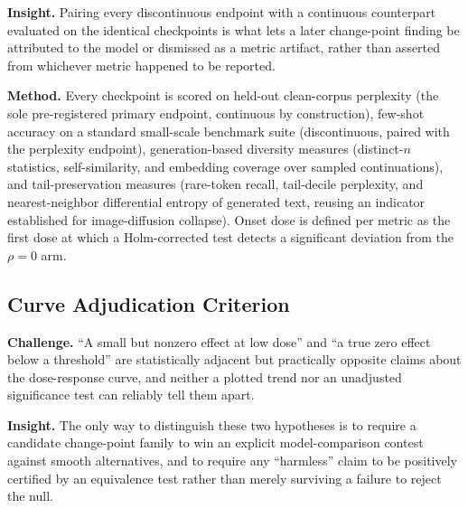 \documentclass[11pt]{article}
\begin{document}
\textbf{Insight.} Pairing every discontinuous endpoint with a continuous counterpart evaluated on the identical checkpoints is what lets a later change-point finding be attributed to the model or dismissed as a metric artifact, rather than asserted from whichever metric happened to be reported.

\textbf{Method.} Every checkpoint is scored on held-out clean-corpus perplexity (the sole pre-registered primary endpoint, continuous by construction), few-shot accuracy on a standard small-scale benchmark suite (discontinuous, paired with the perplexity endpoint), generation-based diversity measures (distinct-$n$ statistics, self-similarity, and embedding coverage over sampled continuations), and tail-preservation measures (rare-token recall, tail-decile perplexity, and nearest-neighbor differential entropy of generated text, reusing an indicator established for image-diffusion collapse). Onset dose is defined per metric as the first dose at which a Holm-corrected test detects a significant deviation from the $\rho = 0$ arm.

\subsection{Curve Adjudication Criterion}
\textbf{Challenge.} ``A small but nonzero effect at low dose'' and ``a true zero effect below a threshold'' are statistically adjacent but practically opposite claims about the dose-response curve, and neither a plotted trend nor an unadjusted significance test can reliably tell them apart.

\textbf{Insight.} The only way to distinguish these two hypotheses is to require a candidate change-point family to win an explicit model-comparison contest against smooth alternatives, and to require any ``harmless'' claim to be positively certified by an equivalence test rather than merely surviving a failure to reject the null.
\end{document}
